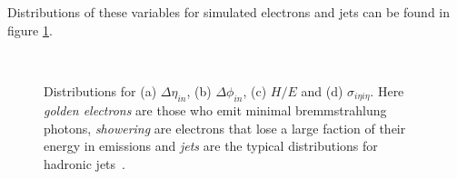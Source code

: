 Distributions of these variables for simulated electrons and jets can be found in figure \ref{FIGURE:PhysicsObjects_Electrons}. 

\begin{figure}[htp]%
\centering
{}\qquad
{}\\
\qquad
{}
\caption[Distributions for the variables $\Delta\eta_{\text in}$, $\Delta\phi_{\text in}$, $\sigma_{i\eta i\eta}$ and $H/E$ for simulated electrons and misidentified jets.]{Distributions for (a) $\Delta\eta_{in}$, (b) $\Delta\phi_{in}$, (c) $H/E$ and (d) $\sigma_{i \eta i \eta}$. Here \textit{golden electrons} are those who emit minimal bremmstrahlung photons, \textit{showering} are electrons that lose a large faction of their energy in emissions and \textit{jets} are the typical distributions for hadronic jets~\cite{ARTICLE:CMSElectronReconstruction}.}
\label{FIGURE:PhysicsObjects_Electrons}
\end{figure}

